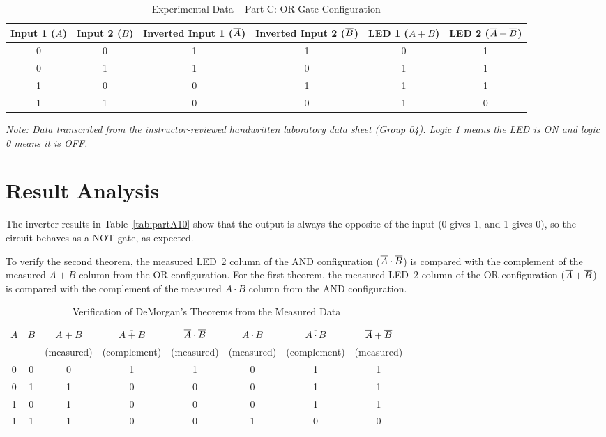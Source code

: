 \begin{table}[H]
	\centering
	\caption{Experimental Data -- Part C: OR Gate Configuration}\label{tab:partC10}
	\small
	\begin{tabular}{@{}cccccc@{}}
		\toprule
		Input 1 ($A$) & Input 2 ($B$) & Inverted Input 1 ($\overline{A}$) & Inverted Input 2 ($\overline{B}$) & LED 1 ($A+B$) & LED 2 ($\overline{A}+\overline{B}$) \\
		\midrule
		0 & 0 & 1 & 1 & 0 & 1 \\
		0 & 1 & 1 & 0 & 1 & 1 \\
		1 & 0 & 0 & 1 & 1 & 1 \\
		1 & 1 & 0 & 0 & 1 & 0 \\
		\bottomrule
	\end{tabular}
\end{table}

\textit{Note: Data transcribed from the instructor-reviewed handwritten laboratory data sheet (Group 04). Logic 1 means the LED is ON and logic 0 means it is OFF.}

\section{Result Analysis}
\label{sec:resultanalysis10}
The inverter results in Table~\ref{tab:partA10} show that the output is always the opposite of the input (0 gives 1, and 1 gives 0), so the circuit behaves as a NOT gate, as expected.

To verify the second theorem, the measured LED~2 column of the AND configuration ($\overline{A}\cdot\overline{B}$) is compared with the complement of the measured $A+B$ column from the OR configuration. For the first theorem, the measured LED~2 column of the OR configuration ($\overline{A}+\overline{B}$) is compared with the complement of the measured $A\cdot B$ column from the AND configuration.

\begin{table}[H]
	\centering
	\caption{Verification of DeMorgan's Theorems from the Measured Data}\label{tab:verification10}
	\small
	\setlength{\tabcolsep}{5pt}
	\begin{tabular}{@{}cc|ccc|ccc@{}}
		\toprule
		$A$ & $B$ & $A+B$ & $\overline{A+B}$ & $\overline{A}\cdot\overline{B}$ & $A\cdot B$ & $\overline{A\cdot B}$ & $\overline{A}+\overline{B}$ \\
		 &  & (measured) & (complement) & (measured) & (measured) & (complement) & (measured) \\
		\midrule
		0 & 0 & 0 & 1 & 1 & 0 & 1 & 1 \\
		0 & 1 & 1 & 0 & 0 & 0 & 1 & 1 \\
		1 & 0 & 1 & 0 & 0 & 0 & 1 & 1 \\
		1 & 1 & 1 & 0 & 0 & 1 & 0 & 0 \\
		\bottomrule
	\end{tabular}
\end{table}

